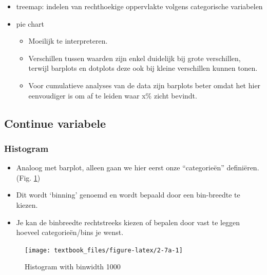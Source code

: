 \documentclass[]{tufte-book}
\providecommand{\tightlist}{%
  \setlength{\itemsep}{0pt}\setlength{\parskip}{0pt}}
\begin{document}
\begin{itemize}
\tightlist
\item
  treemap: indelen van rechthoekige oppervlakte volgens categorische variabelen
\item
  pie chart

  \begin{itemize}
  \tightlist
  \item
    Moeilijk te interpreteren.
  \item
    Verschillen tussen waarden zijn enkel duidelijk bij grote verschillen, terwijl barplots en dotplots deze ook bij kleine verschillen kunnen tonen.
  \item
    Voor cumulatieve analyses van de data zijn barplots beter omdat het hier eenvoudiger is om af te leiden waar x\% zicht bevindt.
  \end{itemize}
\end{itemize}

\hypertarget{continue-variabele}{%
\subsection{Continue variabele}\label{continue-variabele}}

\hypertarget{histogram}{%
\subsubsection{Histogram}\label{histogram}}

\begin{itemize}
\tightlist
\item
  Analoog met barplot, alleen gaan we hier eerst onze ``categorieën'' definiëren. (Fig. \ref{fig:2-7a})
\item
  Dit wordt `binning' genoemd en wordt bepaald door een bin-breedte te kiezen.
\item
  Je kan de binbreedte rechtstreeks kiezen of bepalen door vast te leggen hoeveel categorieën/bins je wenst.
\end{itemize}

\begin{figure}
\texttt{[image: textbook\_files/figure-latex/2-7a-1]} \caption[Histogram with binwidth 1000]{Histogram with binwidth 1000}\label{fig:2-7a}
\end{figure}
\end{document}
